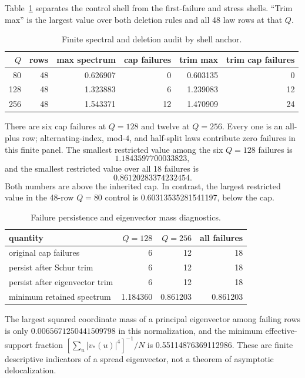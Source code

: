\documentclass[10pt]{article}
\begin{document}
Table~\ref{tab:q} separates the control shell from the first-failure and
stress shells.  ``Trim max'' is the largest value over both deletion rules
and all 48 law rows at that $Q$.

\begin{table}[t]
\centering
\caption{Finite spectral and deletion audit by shell anchor.}
\label{tab:q}
\small
\begin{tabular}{r r r r r r}
\toprule
$Q$ & rows & max spectrum & cap failures & trim max & trim cap failures\\
\midrule
80  & 48 & 0.626907 & 0 & 0.603135 & 0\\
128 & 48 & 1.323883 & 6 & 1.239083 & 12\\
256 & 48 & 1.543371 & 12 & 1.470909 & 24\\
\bottomrule
\end{tabular}
\end{table}

There are six cap failures at $Q=128$ and twelve at $Q=256$.  Every one is
an all-plus row; alternating-index, mod-$4$, and half-split laws contribute
zero failures in this finite panel.  The smallest restricted value among the
six $Q=128$ failures is
\[
1.1843597700033823,
\]
and the smallest restricted value over all 18 failures is
\[
0.86120283374232454.
\]
Both numbers are above the inherited cap.  In contrast, the largest
restricted value in the 48-row $Q=80$ control is
0.60313535281541197, below the cap.

\begin{table}[t]
\centering
\caption{Failure persistence and eigenvector mass diagnostics.}
\label{tab:bulk}
\small
\begin{tabular}{l r r r}
\toprule
quantity & $Q=128$ & $Q=256$ & all failures\\
\midrule
original cap failures & 6 & 12 & 18\\
persist after Schur trim & 6 & 12 & 18\\
persist after eigenvector trim & 6 & 12 & 18\\
minimum retained spectrum & 1.184360 & 0.861203 & 0.861203\\
\bottomrule
\end{tabular}
\end{table}

The largest squared coordinate mass of a principal eigenvector among failing
rows is only $0.0065671250441509798$ in this normalization, and the minimum
effective-support fraction $[\sum_u|v_*(u)|^4]^{-1}/N$ is
0.55114876369112986.  These are finite descriptive indicators of a spread
eigenvector, not a theorem of asymptotic delocalization.
\end{document}
